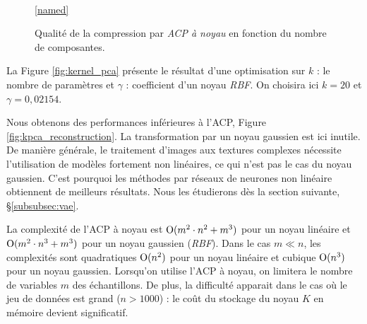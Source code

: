 \begin{figure}[hbtp]
	\centering
	\begin{adjustbox}{width=0.80\textwidth}
	\end{adjustbox}
	\\
	\ref{named}
	\caption{Qualité de la compression par \textit{ACP à noyau} en fonction du nombre de composantes.}
	\label{fig:kpca_plot}
\end{figure}

La Figure \ref{fig:kernel_pca} présente le résultat d'une optimisation sur $k$ : le nombre de paramètres et $\gamma$ : coefficient d'un noyau \textit{RBF}. On choisira ici $k = 20$ et $\gamma = 0,02154$.

Nous obtenons des performances inférieures à l'ACP, Figure \ref{fig:kpca_reconstruction}.
La transformation par un noyau gaussien est ici inutile.
De manière générale, le traitement d'images aux textures complexes nécessite l'utilisation de modèles fortement non linéaires, ce qui n'est pas le cas du noyau gaussien.
C'est pourquoi les méthodes par réseaux de neurones non linéaire obtiennent de meilleurs résultats.
Nous les étudierons dès la section suivante, §\ref{subsubsec:vae}.

La complexité de l'ACP à noyau est $\operatorname{O}(m^{2} \cdot n^2+m^{3})$ pour un noyau linéaire et $\operatorname{O}(m^{2} \cdot n^3+m^{3})$ pour un noyau gaussien (\textit{RBF}).
Dans le cas $m \ll n$, les complexités sont quadratiques $\operatorname{O}(n^2)$ pour un noyau linéaire et cubique $\operatorname{O}(n^3)$ pour un noyau gaussien.
Lorsqu'on utilise l'ACP à noyau, on limitera le nombre de variables $m$ des échantillons.
De plus, la difficulté apparait dans le cas où le jeu de données est grand ($n > 1000$) : le coût du stockage du noyau $K$ en mémoire devient significatif.


